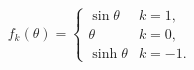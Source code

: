 \begin{equation}
  \label{eq:ftheta}
  f_k(\theta)=\left\{
      \begin{array}{ll}
\sin \theta  & k=1 , \\
 \theta     & k=0 , \\
\sinh \theta &  k=-1 .
      \end{array}\right.
\end{equation}

